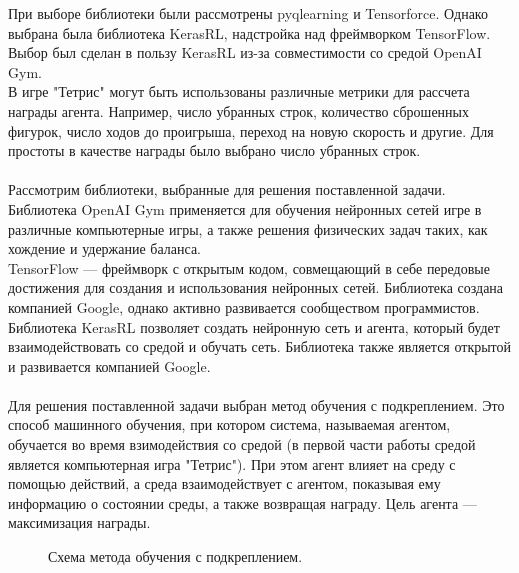 \documentclass{article}
\begin{document}
При выборе библиотеки были рассмотрены pyqlearning\cite{litlink1} и Tensorforce\cite{litlink17}. Однако выбрана была библиотека KerasRL\cite{litlink9}, надстройка над фреймворком TensorFlow\cite{litlink16}. Выбор был сделан в пользу KerasRL из-за совместимости со средой OpenAI Gym.\\
В игре "Тетрис" могут быть использованы различные метрики для рассчета награды агента. Например, число убранных строк, количество сброшенных фигурок, число ходов до проигрыша, переход на новую скорость и другие. Для простоты в качестве награды было выбрано число убранных строк.\\~\\
Рассмотрим библиотеки, выбранные для решения поставленной задачи. Библиотека OpenAI Gym применяется для обучения нейронных сетей игре в различные компьютерные игры, а также решения физических задач таких, как хождение и удержание баланса. \\
TensorFlow — фреймворк с открытым кодом, совмещающий в себе передовые достижения для создания и использования нейронных сетей. Библиотека создана компанией Google, однако активно развивается сообществом программистов\cite{litlink18}.\\
Библиотека KerasRL позволяет создать нейронную сеть и агента, который будет взаимодействовать со средой и обучать сеть. Библиотека также является открытой и развивается компанией Google.\\~\\
Для решения поставленной задачи выбран метод обучения с подкреплением. Это способ машинного обучения, при котором система, называемая агентом, обучается во время взимодействия со средой (в первой части работы средой является компьютерная игра "Тетрис"). При этом агент влияет на среду с помощью действий, а среда взаимодействует с агентом, показывая ему информацию о состоянии среды, а также возвращая награду. Цель агента — максимизация награды.\\
\begin{figure}[h]
\caption{Схема метода обучения с подкреплением\cite{litlink19}.}
\label{ris:image}
\end{figure}
\end{document}
